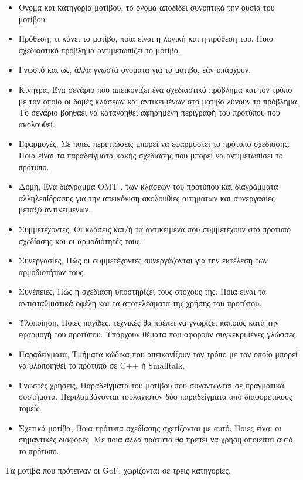 \begin{itemize}
    \item Όνομα και κατηγορία μοτίβου, το όνομα αποδίδει συνοπτικά την ουσία του μοτίβου.
    \item Πρόθεση, τι κάνει το μοτίβο, ποία είναι η λογική και η πρόθεση του. Ποιο σχεδιαστικό πρόβλημα αντιμετωπίζει το μοτίβο.
    \item Γνωστό και ως, άλλα γνωστά ονόματα για το μοτίβο, εάν υπάρχουν.
    \item Κίνητρα, Ένα σενάριο που απεικονίζει ένα σχεδιαστικό πρόβλημα και τον τρόπο με τον οποίο οι
    δομές κλάσεων και αντικειμένων στο μοτίβο λύνουν το πρόβλημα. Το σενάριο βοηθάει να κατανοηθεί
    αφηρημένη περιγραφή του προτύπου που ακολουθεί.
    \item Εφαρμογές, Σε ποιες περιπτώσεις μπορεί να εφαρμοστεί το πρότυπο σχεδίασης. Ποια είναι
    τα παραδείγματα κακής σχεδίασης που μπορεί να αντιμετωπίσει το πρότυπο.
    \item Δομή, Ένα διάγραμμα OMT \cite{citeulike:348271}, των κλάσεων του 
    προτύπου και διαγράμματα αλληλεπίδρασης \cite{jacobson92usecase} για την απεικόνιση ακολουθίες αιτημάτων και συνεργασίες μεταξύ αντικειμένων.
    \item Συμμετέχοντες, Οι κλάσεις και/ή τα αντικείμενα που συμμετέχουν στο πρότυπο σχεδίασης και οι
    αρμοδιότητές τους.
    \item Συνεργασίες, Πώς οι συμμετέχοντες συνεργάζονται για την εκτέλεση των αρμοδιοτήτων τους.
    \item Συνέπειες, Πώς η σχεδίαση υποστηρίζει τους στόχους της. Ποια είναι τα αντισταθμιστικά οφέλη και τα αποτελέσματα της 
    χρήσης του προτύπου.
    \item Υλοποίηση, Ποιες παγίδες, τεχνικές θα πρέπει να γνωρίζει κάποιος κατά την εφαρμογή
    του προτύπου. Υπάρχουν θέματα που αφορούν συγκεκριμένες γλώσσες.
    \item Παραδείγματα, Τμήματα κώδικα που απεικονίζουν τον τρόπο με τον οποίο μπορεί να υλοποιηθεί
    το πρότυπο σε C++ ή Smalltalk.
    \item Γνωστές χρήσεις, Παραδείγματα του μοτίβου που συναντώνται σε πραγματικά συστήματα. Περιλαμβάνονται τουλάχιστον 
    δύο παραδείγματα από διαφορετικούς τομείς.
    \item Σχετικά μοτίβα, Ποια πρότυπα σχεδίασης σχετίζονται με αυτό. Ποιες είναι οι σημαντικές
    διαφορές. Με ποια άλλα πρότυπα θα πρέπει να χρησιμοποιείται αυτό το πρότυπο.
\end{itemize}
Τα μοτίβα που πρότειναν οι GoF, χωρίζονται σε τρεις κατηγορίες, 
